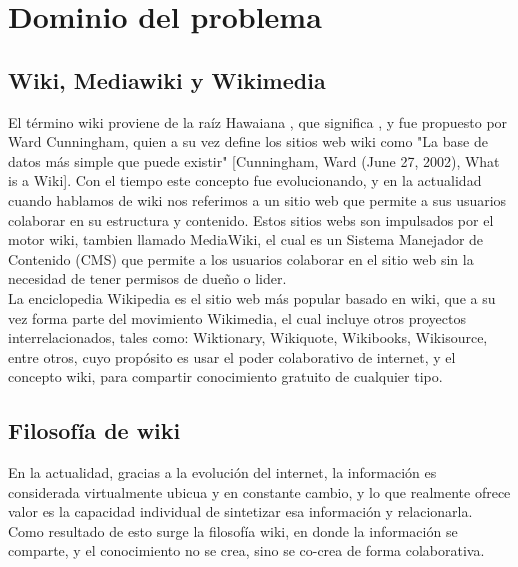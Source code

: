 
\iffalse  \fi

\section{Dominio del problema}
    \subsection{Wiki, Mediawiki y Wikimedia}

        El término wiki proviene de la raíz Hawaiana , que significa , y fue propuesto por Ward Cunningham, quien a su vez define los sitios web wiki como "La base de datos más simple que puede existir" [Cunningham, Ward (June 27, 2002), What is a Wiki]. Con el tiempo este concepto fue evolucionando, y en la actualidad cuando hablamos de wiki nos referimos a un sitio web que permite a sus usuarios colaborar en su estructura y contenido. Estos sitios webs son impulsados por el motor wiki, tambien llamado MediaWiki, el cual es un Sistema Manejador de Contenido (CMS) que permite a los usuarios colaborar en el sitio web sin la necesidad de tener permisos de dueño o lider. \\

        La enciclopedia Wikipedia es el sitio web más popular basado en wiki, que a su vez forma parte del movimiento Wikimedia, el cual incluye otros proyectos interrelacionados, tales como: Wiktionary, Wikiquote, Wikibooks, Wikisource, entre otros, cuyo propósito es usar el poder colaborativo de internet, y el concepto wiki, para compartir conocimiento gratuito de cualquier tipo.\\
     
    \subsection{Filosofía de wiki}

        \iffalse  \fi
        
        En la actualidad, gracias a la evolución del internet, la información es considerada virtualmente ubicua y en constante cambio, y lo que realmente ofrece valor es la capacidad individual de sintetizar esa información y relacionarla. Como resultado de esto surge la filosofía wiki, en donde la información se comparte, y el conocimiento no se crea, sino se co-crea de forma colaborativa. \\


